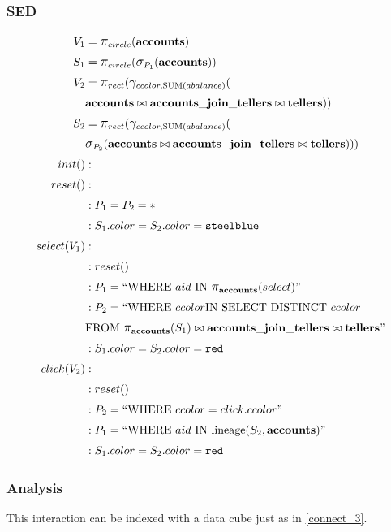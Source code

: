 \subsubsection{SED}
\begin{align*}
	V_1&= \mathlarger{\pi}_{circle}(\bf{accounts})\\
	S_1&= \mathlarger{\pi}_{circle}(\mathlarger{\sigma}_{P_1}(\bf{accounts}))\\
	V_2&= \mathlarger{\pi}_{rect}(\mathlarger{\gamma}_{ccolor, \text{SUM}(abalance)}(\\&\bf{accounts}\bowtie{}\bf{accounts\_join\_tellers}\bowtie{}\bf{tellers}))\\
	S_2&= \mathlarger{\pi}_{rect}(\mathlarger{\gamma}_{ccolor, \text{SUM}(abalance)}(\\&\mathlarger{\sigma}_{P_2}(\bf{accounts}\bowtie{}\bf{accounts\_join\_tellers}\bowtie{}\bf{tellers})))\\
	init()&:\\
	reset()&:\\
	&: P_1 = P_2 = *\\
	&: S_1.color = S_2.color = \texttt{steelblue}\\
	select(V_1)&:\\
	&: reset()\\
	&: P_1 = ``\text{WHERE}~aid~\text{IN}~\mathlarger{\pi}_{\bf{accounts}}(select)"\\
	&: P_2 = ``\text{WHERE}~ccolor\text{IN~SELECT~DISTINCT}~ccolor~\\&\text{FROM}~\mathlarger{\pi}_{\bf{accounts}}(S_1)\bowtie{}\bf{accounts\_join\_tellers}\bowtie{}\bf{tellers}"\\
	&: S_1.color = S_2.color = \texttt{red}\\
	click(V_2)&:\\
	&: reset()\\
	&: P_2 = ``\text{WHERE}~ccolor=click.ccolor"\\
	&: P_1 = ``\text{WHERE}~aid~\text{IN~lineage}(S_2, \bf{accounts})"\\
	&: S_1.color = S_2.color = \texttt{red}\\
\end{align*}
\subsubsection{Analysis}
This interaction can be indexed with a data cube just as in \autoref{connect_3}.
